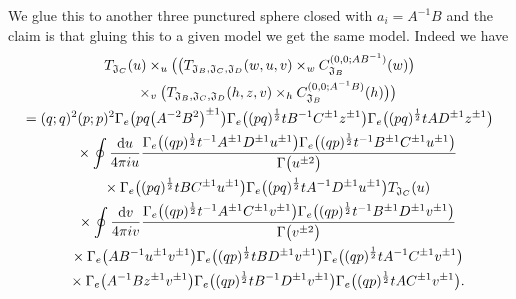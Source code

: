 \documentclass[a4paper,12pt]{article}
\begin{document}
We glue this to another three punctured sphere closed with $a_i=A^{-1}B$ and the claim is that gluing this to a given model we get the same model. Indeed we have
\begin{gather*}
 T_{{\mathfrak J}_C}(u)\times_u \big(\big(T_{{\mathfrak J}_B, {\mathfrak J}_C,{\mathfrak J}_D}(w,u,v)\times_w C^{(0,0;AB^{-1})}_{{\mathfrak J}_B}(w)\big)\\
 \quad{} \times_v\big(T_{{\mathfrak J}_B, {\mathfrak J}_C,{\mathfrak J}_D}(h,z,v)\times_h C^{(0,0;A^{-1}B)}_{{\mathfrak J}_B}(h)\big)\big)\\
=(q;q)^2(p;p)^2\Gamma_e\big(pq\big(A^{-2}B^2\big)^{\pm1}\big)\Gamma_e\big((pq)^\frac12 t B^{-1} C^{\pm1}z^{\pm1}\big)
\Gamma_e\big((pq)^\frac12 t AD^{\pm1}z^{\pm1}\big)\\
\quad{} \times\oint\frac{{\rm d}u}{4\pi i u} \frac{\Gamma_e\big((q p)^{\frac12 }t^{-1} A^{\pm1} D^{\pm1}u^{\pm1}\big)
\Gamma_e\big((q p)^{\frac12 }t^{-1} B^{\pm1} C^{\pm1}u^{\pm1}\big)}{\Gamma\big(u^{\pm2}\big)}\\
\quad{} \times\Gamma_e\big((pq)^\frac12 t B C^{\pm1}u^{\pm1}\big)
\Gamma_e\big((pq)^\frac12 t A^{-1}D^{\pm1}u^{\pm1}\big)T_{{\mathfrak J}_C}(u)\\
\quad{} \times\oint\frac{{\rm d}v}{4\pi i v} \frac{\Gamma_e\big((q p)^{\frac12 }t^{-1} A^{\pm1} C^{\pm1}v^{\pm1}\big)
\Gamma_e\big((q p)^{\frac12 }t^{-1} B^{\pm1} D^{\pm1}v^{\pm1}\big)}{\Gamma\big(v^{\pm2}\big)}\\
\quad{} \times\Gamma_e\big( AB^{-1} u^{\pm1} v^{\pm1}\big)\Gamma_e\big((qp)^{\frac12}t BD^{\pm1} v^{\pm1}\big)
\Gamma_e\big((q p)^{\frac12}t A^{-1} C^{\pm1} v^{\pm1}\big)\\
\quad{} \times\Gamma_e\big( A^{-1}B z^{\pm1} v^{\pm1}\big)\Gamma_e\big((qp)^{\frac12}t B^{-1}D^{\pm1} v^{\pm1}\big)\Gamma_e\big((q p)^{\frac12}t A C^{\pm1} v^{\pm1}\big) .
\end{gather*}
\end{document}
